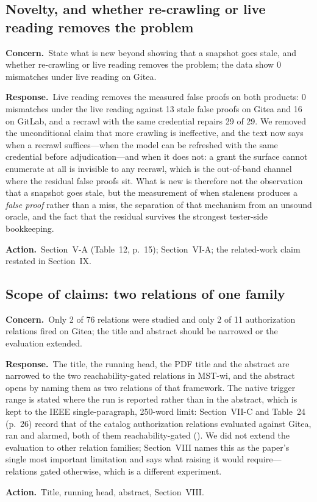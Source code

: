 \documentclass[10pt,letterpaper]{article}
\newcommand{\Concern}[1]{\par\smallskip\noindent\textbf{Concern.}\ #1\par}
\newcommand{\Response}[1]{\par\smallskip\noindent\textbf{Response.}\ #1\par}
\newcommand{\Action}[1]{\par\smallskip\noindent\textbf{Action.}\ #1\par}
\begin{document}
\subsection{Novelty, and whether re-crawling or live reading removes the problem}
\Concern{State what is new beyond showing that a snapshot goes stale, and whether
re-crawling or live reading removes the problem; the data show 0 mismatches under
live reading on Gitea.}
\Response{Live reading removes the measured false proofs on both products: 0
mismatches under the live reading against 13 stale false proofs on Gitea and 16
on GitLab, and a recrawl with the same credential repairs 29 of 29. We removed
the unconditional claim that more crawling is ineffective, and the text now says
when a recrawl suffices---when the model can be refreshed with the same
credential before adjudication---and when it does not: a grant the surface cannot
enumerate at all is invisible to any recrawl, which is the out-of-band channel
where the residual false proofs sit. What is new is therefore not the observation
that a snapshot goes stale, but the measurement of when staleness produces a
\emph{false proof} rather than a miss, the separation of that mechanism from an
unsound oracle, and the fact that the residual survives the strongest
tester-side bookkeeping.}
\Action{Section~V-A (Table~12, p.~15); Section~VI-A; the related-work claim
restated in Section~IX.}

\subsection{Scope of claims: two relations of one family}
\Concern{Only 2 of 76 relations were studied and only 2 of 11 authorization
relations fired on Gitea; the title and abstract should be narrowed or the
evaluation extended.}
\Response{The title, the running head, the PDF title and the abstract are
narrowed to the two reachability-gated relations in MST-wi, and the abstract
opens by naming them as two relations of that framework. The native trigger
range is stated where the run is reported rather than in the abstract, which is
kept to the IEEE single-paragraph, 250-word limit: Section~VII-C and Table~24 (p.~26) record that of the
\NtMrTotal{} catalog authorization relations evaluated against Gitea,
\NtMrExecuted{} ran and \NtMrFired{} alarmed, both of them reachability-gated
(\NtKeyMrNames{}). We did not extend the evaluation to other relation
families; Section~VIII
names this as the paper's single most important limitation and says what raising
it would require---relations gated otherwise, which is a different experiment.}
\Action{Title, running head, abstract, Section~VIII.}
\end{document}
